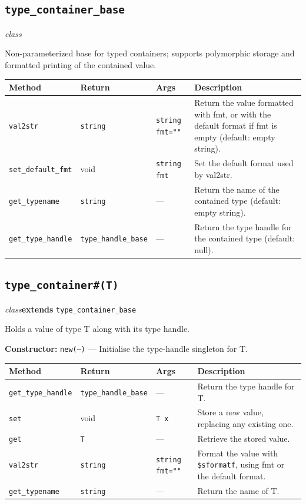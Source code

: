 \documentclass[11pt,letterpaper]{report}
\begin{document}
\subsection*{\texttt{type\_container\_base}}
\noindent\small\textit{class}\par

Non-parameterized base for typed containers; supports polymorphic storage and formatted printing of the contained value.

\begin{xltabular}{\linewidth}{>{\small}p{1.35in} >{\small}p{1.25in} >{\small}p{0.95in} >{\small}X}
\toprule
\textbf{Method} & \textbf{Return} & \textbf{Args} & \textbf{Description} \\
\midrule
\endhead
\bottomrule
\endfoot
\texttt{val2str} & \texttt{string} & \texttt{string fmt=""} & Return the value formatted with fmt, or with the default format if fmt is empty (default: empty string). \\
\texttt{set\_default\_fmt} & void & \texttt{string fmt} & Set the default format used by val2str. \\
\texttt{get\_typename} & \texttt{string} & --- & Return the name of the contained type (default: empty string). \\
\texttt{get\_type\_handle} & \texttt{type\_handle\_base} & --- & Return the type handle for the contained type (default: null). \\
\end{xltabular}

\subsection*{\texttt{type\_container\#(T)}}
\noindent\small\textit{class}\quad \textbf{extends} \texttt{type\_container\_base}\par

Holds a value of type T along with its type handle.

\noindent\textbf{Constructor:} \texttt{new(---)} --- Initialise the type-handle singleton for T.

\begin{xltabular}{\linewidth}{>{\small}p{1.35in} >{\small}p{1.25in} >{\small}p{0.95in} >{\small}X}
\toprule
\textbf{Method} & \textbf{Return} & \textbf{Args} & \textbf{Description} \\
\midrule
\endhead
\bottomrule
\endfoot
\texttt{get\_type\_handle} & \texttt{type\_handle\_base} & --- & Return the type handle for T. \\
\texttt{set} & void & \texttt{T x} & Store a new value, replacing any existing one. \\
\texttt{get} & \texttt{T} & --- & Retrieve the stored value. \\
\texttt{val2str} & \texttt{string} & \texttt{string fmt=""} & Format the value with \texttt{\$sformatf}, using fmt or the default format. \\
\texttt{get\_typename} & \texttt{string} & --- & Return the name of T. \\
\end{xltabular}
\end{document}
